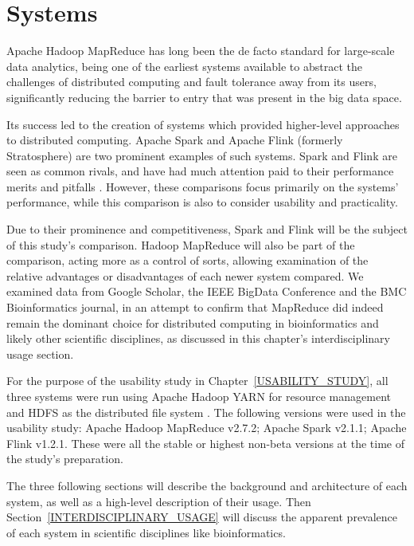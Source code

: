   
\section{Systems}
\label{SYSTEMS}

  Apache Hadoop MapReduce \cite{DeanG:MAPREDUCE:OSDI2004} has long been the de facto standard for large-scale data analytics, being one of the earliest systems available to abstract the challenges of distributed computing and fault tolerance away from its users, significantly reducing the barrier to entry that was present in the big data space.

  Its success led to the creation of systems which provided higher-level approaches to distributed computing. Apache Spark \cite{ZahariaCFSS:HotCloud10} and Apache Flink (formerly Stratosphere) \cite{CarboneKEMHT:DEBU2015} are two prominent examples of such systems. Spark and Flink are seen as common rivals, and have had much attention paid to their performance merits and pitfalls \cite{MARCU:SPARK_VS_FLINK:2016,PereraPH:CORR2016,VEIGA:EVALUATION:2015}. However, these comparisons focus primarily on the systems' performance, while this comparison is also to consider usability and practicality.

  Due to their prominence and competitiveness, Spark and Flink will be the subject of this study's comparison. Hadoop MapReduce will also be part of the comparison, acting more as a control of sorts, allowing examination of the relative advantages or disadvantages of each newer system compared. We examined data from Google Scholar, the IEEE BigData Conference and the BMC Bioinformatics journal, in an attempt to confirm that MapReduce did indeed remain the dominant choice for distributed computing in bioinformatics and likely other scientific disciplines, as discussed in this chapter's interdisciplinary usage section. 

  For the purpose of the usability study in Chapter~\ref{USABILITY_STUDY}, all three systems were run using Apache Hadoop YARN for resource management \cite{VAVILAPALLI:YARN:2013} and HDFS as the distributed file system \cite{SHVACHKO:HDFS:2010}. The following versions were used in the usability study: Apache Hadoop MapReduce v2.7.2; Apache Spark v2.1.1; Apache Flink v1.2.1. These were all the stable or highest non-beta versions at the time of the study's preparation.
  
  The three following sections will describe the background and architecture of each system, as well as a high-level description of their usage. Then Section~\ref{INTERDISCIPLINARY_USAGE} will discuss the apparent prevalence of each system in scientific disciplines like bioinformatics.


